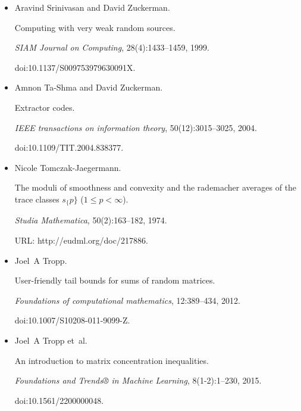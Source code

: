 \begin{itemize}
\item[] 
[34]

Aravind Srinivasan and David Zuckerman.


Computing with very weak random sources.


\emph{SIAM Journal on Computing}, 28(4):1433–1459, 1999.


doi:10.1137/S009753979630091X.





\item[] 
[35]

Amnon Ta-Shma and David Zuckerman.


Extractor codes.


\emph{IEEE transactions on information theory}, 50(12):3015–3025,
2004.


doi:10.1109/TIT.2004.838377.





\item[] 
[36]

Nicole Tomczak-Jaegermann.


The moduli of smoothness and convexity and the rademacher averages of
the trace classes $s_{\{}p\}$ ($1\leq p<\infty$).


\emph{Studia Mathematica}, 50(2):163–182, 1974.


URL: http://eudml.org/doc/217886.





\item[] 
[37]

Joel A Tropp.


User-friendly tail bounds for sums of random matrices.


\emph{Foundations of computational mathematics}, 12:389–434, 2012.


doi:10.1007/S10208-011-9099-Z.





\item[] 
[38]

Joel A Tropp et al.


An introduction to matrix concentration inequalities.


\emph{Foundations and Trends® in Machine Learning},
8(1-2):1–230, 2015.


doi:10.1561/2200000048.






\end{itemize}
